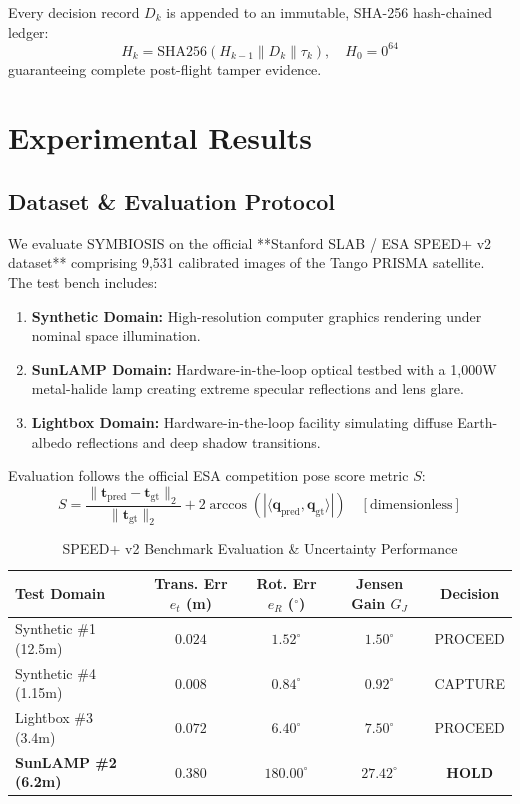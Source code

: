 \documentclass[conference]{IEEEtran}
\begin{document}
Every decision record $D_k$ is appended to an immutable, SHA-256 hash-chained ledger:
\begin{equation}
H_k = \mathrm{SHA256}\left( H_{k-1} \parallel D_k \parallel \tau_k \right), \quad H_0 = 0^{64}
\end{equation}
guaranteeing complete post-flight tamper evidence.

\section{Experimental Results}

\subsection{Dataset \& Evaluation Protocol}
We evaluate SYMBIOSIS on the official **Stanford SLAB / ESA SPEED+ v2 dataset** comprising 9,531 calibrated images of the Tango PRISMA satellite. The test bench includes:
\begin{enumerate}
    \item \textbf{Synthetic Domain:} High-resolution computer graphics rendering under nominal space illumination.
    \item \textbf{SunLAMP Domain:} Hardware-in-the-loop optical testbed with a 1,000W metal-halide lamp creating extreme specular reflections and lens glare.
    \item \textbf{Lightbox Domain:} Hardware-in-the-loop facility simulating diffuse Earth-albedo reflections and deep shadow transitions.
\end{enumerate}

Evaluation follows the official ESA competition pose score metric $S$:
\begin{equation}
S = \frac{\|\mathbf{t}_{\text{pred}} - \mathbf{t}_{\text{gt}}\|_2}{\|\mathbf{t}_{\text{gt}}\|_2} + 2 \arccos\left(|\langle \mathbf{q}_{\text{pred}}, \mathbf{q}_{\text{gt}} \rangle|\right) \quad [\text{dimensionless}]
\end{equation}

\begin{table}[t]
\caption{SPEED+ v2 Benchmark Evaluation \& Uncertainty Performance}
\label{tab:speed_results}
\centering
\begin{tabular}{lcccc}
\toprule
\textbf{Test Domain} & \textbf{Trans. Err $e_t$ (m)} & \textbf{Rot. Err $e_R$ ($^\circ$)} & \textbf{Jensen Gain $G_J$} & \textbf{Decision} \\
\midrule
Synthetic \#1 (12.5m) & $0.024$ & $1.52^\circ$ & $1.50^\circ$ & PROCEED \\
Synthetic \#4 (1.15m) & $0.008$ & $0.84^\circ$ & $0.92^\circ$ & CAPTURE \\
Lightbox \#3 (3.4m)   & $0.072$ & $6.40^\circ$ & $7.50^\circ$ & PROCEED \\
\textbf{SunLAMP \#2 (6.2m)} & $\mathbf{0.380}$ & $\mathbf{180.00^\circ}$ & $\mathbf{27.42^\circ}$ & \textbf{HOLD} \\
\bottomrule
\end{tabular}
\end{table}
\end{document}
